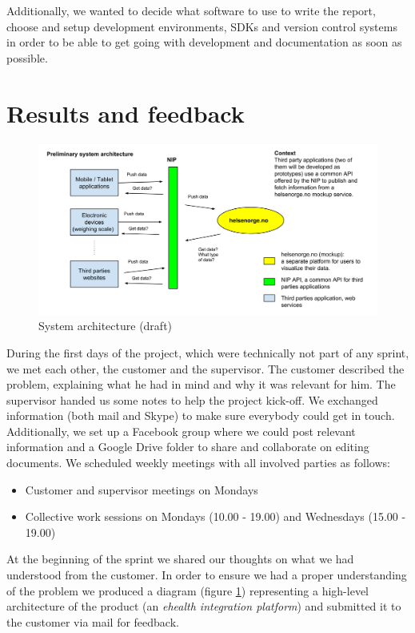 Additionally, we wanted to decide what software to use to write the report, choose and setup development environments, SDKs and version control systems in order to be able to get going with development and documentation as soon as possible.


\section{Results and feedback}

\begin{figure}[h]
\centering
\includegraphics[scale=0.30]{../Figures/architecture-draft.png}
\caption{System architecture (draft)}
\label{figure:architecture-draft}
\end{figure}

During the first days of the project, which were technically not part of any sprint, we met each other, the customer and the supervisor.
The customer described the problem, explaining what he had in mind and why it was relevant for him.
The supervisor handed us some notes to help the project kick-off.
We exchanged information (both mail and Skype) to make sure everybody could get in touch. 
Additionally, we set up a Facebook group where we could post relevant information and a Google Drive folder to share and collaborate on editing documents.
We scheduled weekly meetings with all involved parties as follows:
\begin{itemize}
\item Customer and supervisor meetings on Mondays
\item Collective work sessions on Mondays (10.00 - 19.00) and Wednesdays (15.00 - 19.00)
\end{itemize}

At the beginning of the sprint we shared our thoughts on what we had understood from the customer.
In order to ensure we had a proper understanding of the problem we produced a diagram (figure \ref{figure:architecture-draft}) representing a high-level architecture of the product (an \textit{ehealth integration platform}) and submitted it to the customer via mail for feedback.


